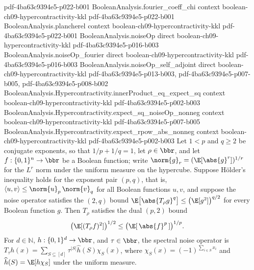 \begin{theorem}
  {pdf-4ba63c9394e5-p022-b001}
\proofstep
  {BooleanAnalysis.fourier_coeff_chi}
  {context}
  {boolean-ch09-hypercontractivity-kkl}
  {pdf-4ba63c9394e5-p022-b001}
\proofstep
  {BooleanAnalysis.plancherel}
  {context}
  {boolean-ch09-hypercontractivity-kkl}
  {pdf-4ba63c9394e5-p022-b001}
\proofstep
  {BooleanAnalysis.noiseOp}
  {direct}
  {boolean-ch09-hypercontractivity-kkl}
  {pdf-4ba63c9394e5-p016-b003}
\proofstep
  {BooleanAnalysis.noiseOp_fourier}
  {direct}
  {boolean-ch09-hypercontractivity-kkl}
  {pdf-4ba63c9394e5-p016-b003}
\proofstep
  {BooleanAnalysis.noiseOp_self_adjoint}
  {direct}
  {boolean-ch09-hypercontractivity-kkl}
  {pdf-4ba63c9394e5-p013-b003,
    pdf-4ba63c9394e5-p007-b005,
    pdf-4ba63c9394e5-p008-b002}
\proofstep
  {BooleanAnalysis.Hypercontractivity.innerProduct_eq_expect_sq}
  {context}
  {boolean-ch09-hypercontractivity-kkl}
  {pdf-4ba63c9394e5-p002-b003}
\proofstep
  {BooleanAnalysis.Hypercontractivity.expect_sq_noiseOp_nonneg}
  {context}
  {boolean-ch09-hypercontractivity-kkl}
  {pdf-4ba63c9394e5-p007-b005}
\proofstep
  {BooleanAnalysis.Hypercontractivity.expect_rpow_abs_nonneg}
  {context}
  {boolean-ch09-hypercontractivity-kkl}
  {pdf-4ba63c9394e5-p002-b003}
Let $1 < p$ and $q \ge 2$ be conjugate exponents, so that $1/p + 1/q = 1$, let $\rho \in
\bbr$, and let $f : \{0,1\}^n \to \bbr$ be a Boolean function; write $\norm{g}_r =
(\E[\abs{g}^r])^{1/r}$ for the $L^r$ norm under the uniform measure on the hypercube.
Suppose Hölder's inequality holds for the exponent pair $(p,q)$, that is, $\langle u,
v\rangle \le \norm{u}_p\,\norm{v}_q$ for all Boolean functions $u,v$, and suppose the
noise operator satisfies the $(2,q)$ bound $\E\bigl[\abs{T_\rho g}^q\bigr] \le
\bigl(\E[g^2]\bigr)^{q/2}$ for every Boolean function $g$. Then $T_\rho$ satisfies the
dual $(p,2)$ bound
\[
  \bigl(\E[(T_\rho f)^2]\bigr)^{1/2} \le \bigl(\E[\,\abs{f}^p\,]\bigr)^{1/p}.
\] For $d\in\mathbb N$, $h:\{0,1\}^d\to\bbr$, and $\tau\in\bbr$, the spectral noise
operator is $T_\tau h(x)=\sum_{S\subseteq[d]}\tau^{|S|}\widehat h(S)\chi_S(x)$, where
$\chi_S(x)=(-1)^{\sum_{i\in S}x_i}$ and $\widehat h(S)=\E[h\chi_S]$ under the uniform
measure.
\end{theorem}
